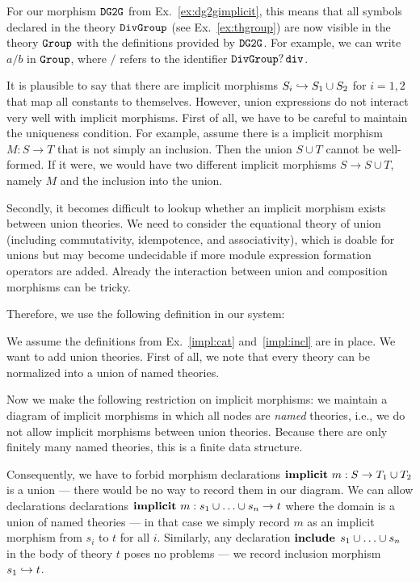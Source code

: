 \begin{example}
	For our morphism $\operatorname{\mathtt{DG2G}}$ from Ex.~\ref{ex:dg2gimplicit}, this means that all symbols declared in the theory $\operatorname{\mathtt{DivGroup}}$ (see Ex.~\ref{ex:thgroup}) are now visible in the theory $\operatorname{\mathtt{Group}}$ with the definitions provided by $\operatorname{\mathtt{DG2G}}$.
	For example, we can write $a/b$ in $\operatorname{\mathtt{Group}}$, where $/$ refers to the identifier $\operatorname{\mathtt{DivGroup}}?\operatorname{\mathtt{div}}$.
\end{example}

\begin{union}
It is plausible to say that there are implicit morphisms $S_i\hookrightarrow S_1\cup S_2$ for $i=1,2$ that map all constants to themselves.
However, union expressions do not interact very well with implicit morphisms.
First of all, we have to be careful to maintain the uniqueness condition.
For example, assume there is a implicit morphism $M:S\to T$ that is not simply an inclusion.
Then the union $S\cup T$ cannot be well-formed.
If it were, we would have two different implicit morphisms $S\to S\cup T$, namely $M$ and the inclusion into the union.

Secondly, it becomes difficult to lookup whether an implicit morphism exists between union theories.
We need to consider the equational theory of union (including commutativity, idempotence, and associativity), which is doable for unions but may become undecidable if more module expression formation operators are added.
Already the interaction between union and composition morphisms can be tricky.

Therefore, we use the following definition in our system:

\begin{example}\label{impl:union}
We assume the definitions from Ex.~\ref{impl:cat} and~\ref{impl:incl} are in place.
We want to add union theories.
First of all, we note that every theory can be normalized into a union of named theories.

Now we make the following restriction on implicit morphisms: we maintain a diagram of implicit morphisms in which all nodes are \emph{named} theories, i.e., we do not allow implicit morphisms between union theories.
Because there are only finitely many named theories, this is a finite data structure.

Consequently, we have to forbid morphism declarations $\operatorname{\mathbf{implicit}}\,m:S\to T_1\cup T_2$ is a union --- there would be no way to record them in our diagram.
We can allow declarations declarations $\operatorname{\mathbf{implicit}}\,m:s_1\cup\ldots\cup s_n\to t$ where the domain is a union of named theories --- in that case we simply record $m$ as an implicit morphism from $s_i$ to $t$ for all $i$.
Similarly, any declaration $\operatorname{\mathbf{include}}{\;s_1\cup\ldots\cup s_n}$ in the body of theory $t$ poses no problems --- we record inclusion morphism $s_1\hookrightarrow t$.


\end{example}
\end{union}
